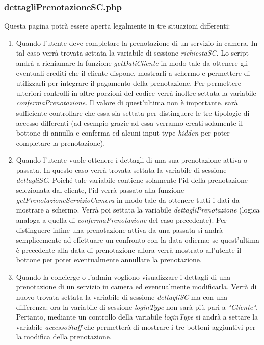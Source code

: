 \documentclass [a4paper, 12pt]{book}
\begin{document}
\subsubsection{dettagliPrenotazioneSC.php}
Questa pagina potrà essere aperta legalmente in tre situazioni differenti:
\begin{enumerate}
\item Quando l'utente deve completare la prenotazione di un servizio in camera. In tal caso verrà trovata settata la variabile di sessione \textit{richiestaSC}. Lo script andrà a richiamare la funzione \textit{getDatiCliente} in modo tale da ottenere gli eventuali crediti che il cliente dispone, mostrarli a schermo e permettere di utilizzarli per integrare il pagamento della prenotazione. Per permettere ulteriori controlli in altre porzioni del codice verrà inoltre settata la variabile \textit{confermaPrenotazione}. Il valore di quest'ultima non è importante, sarà sufficiente controllare che essa sia settata per distinguere le tre tipologie di accesso differenti (ad esempio grazie ad essa verranno creati solamente il bottone di annulla e conferma ed alcuni input type \textit{hidden} per poter completare la prenotazione).
\item Quando l'utente vuole ottenere i dettagli di una sua prenotazione attiva o passata. In questo caso verrà trovata settata la variabile di sessione \textit{dettagliSC}. Poiché tale variabile contiene solamente l'id della prenotazione selezionata dal cliente, l'id verrà passato alla funzione \textit{getPrenotazioneServizioCamera} in modo tale da ottenere tutti i dati da mostrare a schermo. Verrà poi settata la variabile \textit{dettagliPrenotazione} (logica analoga a quella di \textit{confermaPrenotazione} del caso precedente). Per distinguere infine una prenotazione attiva da una passata si andrà semplicemente ad effettuare un confronto con la data odierna: se quest'ultima è precedente alla data di prenotazione allora verrà mostrato all'utente il bottone per poter eventualmente annullare la prenotazione.
\item Quando la concierge o l'admin vogliono visualizzare i dettagli di una prenotazione di un servizio in camera ed eventualmente modificarla. Verrà di nuovo trovata settata la variabile di sessione \textit{dettagliSC} ma con una differenza: ora la variabile di sessione \textit{loginType} non sarà più pari a \textit{"Cliente"}. Pertanto, mediante un controllo della variabile \textit{loginType} si andrà a settare la variabile \textit{accessoStaff} che permetterà di mostrare i tre bottoni aggiuntivi per la modifica della prenotazione.
\end{enumerate}
\end{document}
